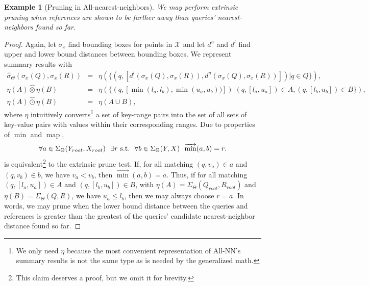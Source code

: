 \documentclass{article}
\newtheorem{example} {Example}
\newcommand{\GNP}[1][\psi]{{#1}_{\Theta}}
\newcommand{\sigmahat}{\mathbin{\widehat{\sigma}}}
\newcommand{\otimeshat}{\mathbin{\widehat{\otimes}}}
\newcommand{\odothat}{\mathbin{\widehat{\odot}}}
\DeclareMathOperator*{\map}{map}
\newcommand{\st}{{\rm~s.t.~}}
\newcommand{\disthrectmin}{d^{l}}
\newcommand{\disthrectmax}{d^{u}}
\newcommand{\kdleft}[1]{#1^{\!L}}
\newcommand{\kdright}[1]{#1^{\!R}}
\begin{document}
\begin{example}[Pruning in All-nearest-neighbors]
  We may perform extrinsic pruning when references are shown to be
  farther away than queries' nearest-neighbors found so far.
\end{example}
\begin{proof}
  Again, let $\sigma_x$ find bounding boxes for points in
  $\mathcal{X}$ and let $\disthrectmax$ and $\disthrectmin$ find upper and
  lower bound distances between bounding boxes.  We represent summary
  results with
  \begin{eqnarray*}
    \GNP[\sigmahat](\sigma_x(Q),\sigma_x(R)) & = & \eta(\{(q,[\disthrectmin(\sigma_x(Q),\sigma_x(R)), \disthrectmax(\sigma_x(Q),\sigma_x(R))]) | q \in Q\}), \\
    \eta(A) \otimeshat \eta(B) & = & \eta(\{(q,[\min(l_a,l_b),\min(u_a,u_b))]) | (q,[l_a,u_a]) \in A, (q,[l_b,u_b]) \in B\}), \\
    \eta(A) \odothat \eta(B) & = & \eta(A \cup B),
  \end{eqnarray*}
  where $\eta$ intuitively converts\footnote{We only need $\eta$
  because the most convenient representation of All-NN's summary
  results is not the same type as is needed by the generalized math.}
  a set of key-range pairs into the set of all sets of key-value pairs
  with values within their corresponding ranges.  Due to properties of
  $\min$ and $\map$,
  \[
  \forall a \in \GNP[\Sigma](Y_{root},X_{root})~~ \exists r \st~ \forall b \in \GNP[\Sigma](Y,X)~~ \overrightarrow{\min}(a,b) = r.
  \]
  is equivalent\footnote{This claim deserves a proof, but we omit it
  for brevity.} to the extrinsic prune test.  If, for all matching
  $(q,v_a) \in a$ and $(q,v_b) \in b$, we have $v_a < v_b$, then
  $\overrightarrow{\min}(a,b) = a$.  Thus, if for all matching
  $(q,[l_a,u_a]) \in A$ and $(q,[l_b,u_b]) \in B$, with $\eta(A) =
  \GNP[\Sigma](Q_{root},R_{root})$ and $\eta(B) = \GNP[\Sigma](Q,R)$,
  we have $u_a \leq l_b$, then we may always choose $r = a$.  In
  words, we may prune when the lower bound distance between the
  queries and references is greater than the greatest of the queries'
  candidate nearest-neighbor distance found so far.
\end{proof}
\end{document}
